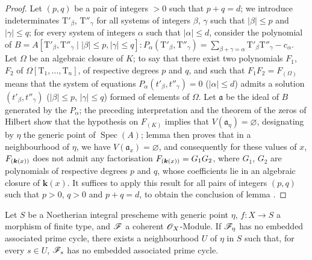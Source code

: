 \begin{proof}
Let $(p,q)$ be a pair of integers $>0$ such that $p+q=d$; we introduce indeterminates $\mathrm{T}'_\beta$, $\mathrm{T}''_\gamma$ for all systems of integers $\beta$, $\gamma$ such that $|\beta|\leqslant p$ and $|\gamma|\leqslant q$; for every system of integers $\alpha$ such that $|\alpha|\leqslant d$, consider the polynomial of $B=A[\mathrm{T}'_\beta, \mathrm{T}''_\gamma \mid |\beta|\leqslant p, |\gamma|\leqslant q]: P_\alpha(\mathrm{T}'_\beta,\mathrm{T}''_\gamma)=\sum_{\beta+\gamma=\alpha}\mathrm{T}'_\beta \mathrm{T}''_\gamma-c_\alpha$.
Let $\Omega$ be an algebraic closure of $K$; to say that there exist two polynomials $F_1$, $F_2$ of $\Omega[\mathrm{T}_1,\ldots,\mathrm{T}_n]$, of respective degrees $p$ and $q$, and such that $F_1 F_2=F_{(\Omega)}$ means that the system of equations $P_\alpha(t'_\beta,t''_\gamma)=0$ ($|\alpha|\leqslant d$) admits a solution $(t'_\beta,t''_\gamma)$ ($|\beta|\leqslant p$, $|\gamma|\leqslant q$) formed of elements of $\Omega$.
Let $\mathfrak{a}$ be the ideal of $B$ generated by the $P_\alpha$; the preceding interpretation and the theorem of the zeros of Hilbert show that the hypothesis on $F_{(K)}$ implies that $V(\mathfrak{a}_\eta)=\varnothing$, designating by $\eta$ the generic point of $\operatorname{Spec}(A)$; lemma  then proves that in a neighbourhood of $\eta$, we have $V(\mathfrak{a}_x)=\varnothing$, and consequently for these values of $x$, $F_{(\boldsymbol{k}(x))}$ does not admit any factorisation $F_{(\boldsymbol{k}(x))}=G_1 G_2$, where $G_1$, $G_2$ are polynomials of respective degrees $p$ and $q$, whose coefficients lie in an algebraic closure of $\boldsymbol{k}(x)$.
It suffices to apply this result for all pairs of integers $(p,q)$ such that $p>0$, $q>0$ and $p+q=d$, to obtain the conclusion of lemma .
\end{proof}

\begin{proposition}[9.7.6]
\label{IV.9.7.6}
Let $S$ be a Noetherian integral prescheme with generic point $\eta$, $f:X\to S$ a morphism of finite type, and $\mathscr{F}$ a coherent $\mathscr{O}_X$-Module.
If $\mathscr{F}_\eta$ has no embedded associated prime cycle, there exists a neighbourhood $U$ of $\eta$ in $S$ such that, for every $s\in U$, $\mathscr{F}_s$ has no embedded associated prime cycle.
\end{proposition}

